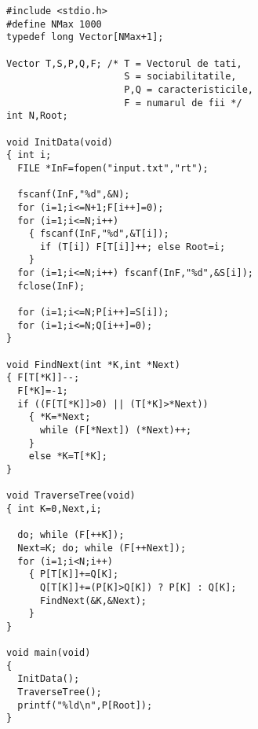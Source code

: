 \begin{verbatim}
#include <stdio.h>
#define NMax 1000
typedef long Vector[NMax+1];

Vector T,S,P,Q,F; /* T = Vectorul de tati,
                     S = sociabilitatile,
                     P,Q = caracteristicile,
                     F = numarul de fii */
int N,Root;

void InitData(void)
{ int i;
  FILE *InF=fopen("input.txt","rt");

  fscanf(InF,"%d",&N);
  for (i=1;i<=N+1;F[i++]=0);
  for (i=1;i<=N;i++)
    { fscanf(InF,"%d",&T[i]);
      if (T[i]) F[T[i]]++; else Root=i;
    }
  for (i=1;i<=N;i++) fscanf(InF,"%d",&S[i]);
  fclose(InF);

  for (i=1;i<=N;P[i++]=S[i]);
  for (i=1;i<=N;Q[i++]=0);
}

void FindNext(int *K,int *Next)
{ F[T[*K]]--;
  F[*K]=-1;
  if ((F[T[*K]]>0) || (T[*K]>*Next))
    { *K=*Next;
      while (F[*Next]) (*Next)++;
    }
    else *K=T[*K];
}

void TraverseTree(void)
{ int K=0,Next,i;

  do; while (F[++K]);
  Next=K; do; while (F[++Next]);
  for (i=1;i<N;i++)
    { P[T[K]]+=Q[K];
      Q[T[K]]+=(P[K]>Q[K]) ? P[K] : Q[K];
      FindNext(&K,&Next);
    }
}

void main(void)
{
  InitData();
  TraverseTree();
  printf("%ld\n",P[Root]);
}
\end{verbatim}
